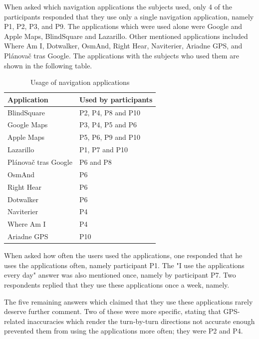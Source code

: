 \documentclass[nolof,digital]{fithesis3}
\begin{document}
When asked which navigation applications the subjects used, only 4 of the participants responded that they use only a single navigation application, namely P1, P2, P3, and P9. The applications which were used alone were Google and Apple Maps, BlindSquare and Lazarillo. Other mentioned applications included Where Am I, Dotwalker, OsmAnd, Right Hear, Naviterier, Ariadne GPS, and Plánovač tras Google. The applications with the subjects who used them are shown in the following table.

\vspace*{0.5 cm}
\begin{table}
\caption{Usage of navigation applications}
\begin{tabularx}{\textwidth}{|X|X|}
\hline
Application & Used by participants \\
\hline
BlindSquare \parencite{blindsquare} & P2, P4, P8 and P10 \\
Google Maps \parencite{googlemaps} & P3, P4, P5 and P6 \\
Apple Maps \parencite{applemaps} & P5, P6, P9 and P10 \\
Lazarillo \parencite{lazarillo} & P1, P7 and P10 \\
Plánovač tras Google \parencite{ptg} & P6 and P8 \\
OsmAnd \parencite{osmand} & P6 \\
Right Hear \parencite{righthear} & P6 \\
Dotwalker \parencite{dotwalker} & P6 \\
Naviterier \parencite{naviterier} & P4 \\
Where Am I \parencite{whereami} & P4 \\
Ariadne GPS \parencite{ariadnegps} & P10 \\
\hline
\end{tabularx}
\end{table}

When asked how often the users used the applications, one responded that he uses the applications often, namely participant P1. The "I use the applications every day" answer was also mentioned once, namely by participant P7. Two respondents replied that they use these applications once a week, namely.

The five remaining answers which claimed that they use these applications rarely deserve further comment. Two of these were more specific, stating that GPS-related inaccuracies which render the turn-by-turn directions not accurate enough prevented them from using the applications more often; they were P2 and P4.
\end{document}
